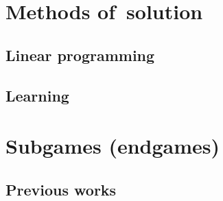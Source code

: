 \section{Methods of~solution}

\subsection{Linear programming}

\subsection{Learning}

\section{Subgames (endgames)}

\subsection{Previous works}
